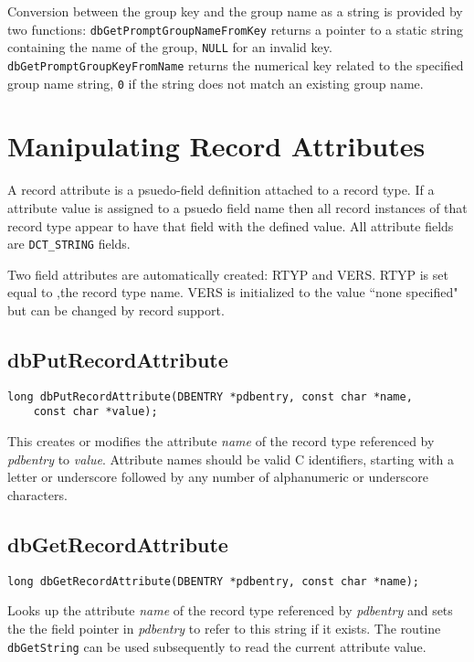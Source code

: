 Conversion between the group key and the group name as a string is provided by two functions:
\verb|dbGetPromptGroupNameFromKey| returns a pointer to a static string containing the name of the group,
\verb|NULL| for an invalid key.
\verb|dbGetPromptGroupKeyFromName| returns the numerical key related to the specified group name string,
\verb|0| if the string does not match an existing group name.

\section{Manipulating Record Attributes}

A record attribute is a psuedo-field definition attached to a record type. If a attribute value is assigned to a psuedo field 
name then all record instances of that record type appear to have that field with the defined value. All attribute fields are 
\verb|DCT_STRING| fields.

Two field attributes are automatically created: RTYP and VERS. RTYP is set equal to ,the record type name. VERS is 
initialized to the value ``none specified" but can be changed by record support.

\subsection{dbPutRecordAttribute}

\begin{verbatim}
long dbPutRecordAttribute(DBENTRY *pdbentry, const char *name,
    const char *value);
\end{verbatim}

This creates or modifies the attribute \emph{name} of the record type referenced by \emph{pdbentry} to \emph{value}.
Attribute names should be valid C identifiers, starting with a letter or underscore followed by any number of alphanumeric or underscore characters.

\subsection{dbGetRecordAttribute}

\begin{verbatim}
long dbGetRecordAttribute(DBENTRY *pdbentry, const char *name);
\end{verbatim}

Looks up the attribute \emph{name} of the record type referenced by \emph{pdbentry} and sets the the field pointer in \emph{pdbentry} to refer to this string if it exists.
The routine \verb|dbGetString| can be used subsequently to read the current attribute value.

